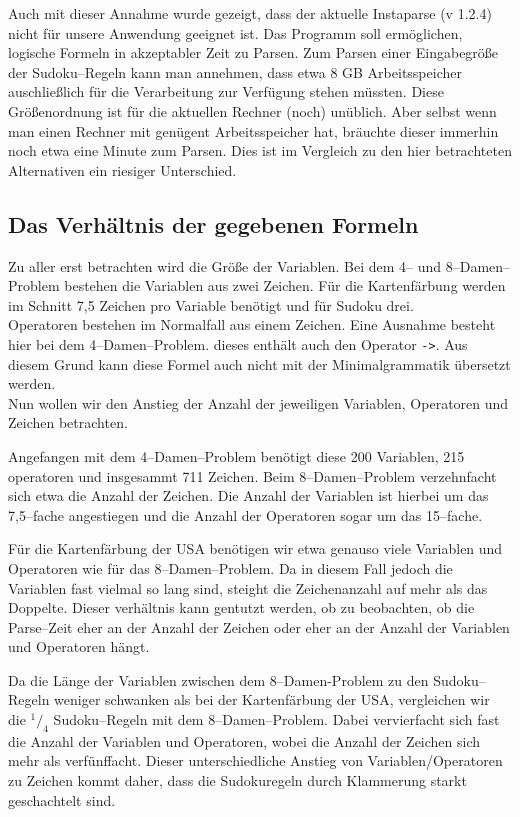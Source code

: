 \documentclass[ngerman,a4paper,abstracton,open=right,twoside=false,toc=listofnumbered,bibtotocnumbered]{scrreprt}
\begin{document}
Auch mit dieser Annahme wurde gezeigt, dass der aktuelle Instaparse (v 1.2.4) nicht für unsere Anwendung geeignet ist. Das Programm soll ermöglichen, logische Formeln in akzeptabler Zeit zu Parsen. Zum Parsen einer Eingabegröße der Sudoku--Regeln kann man annehmen, dass etwa 8 GB Arbeitsspeicher auschließlich für die Verarbeitung zur Verfügung stehen müssten. Diese Größenordnung ist für die aktuellen Rechner (noch) unüblich. Aber selbst wenn man einen Rechner mit genügent Arbeitsspeicher hat, bräuchte dieser immerhin noch etwa eine Minute zum Parsen. Dies ist im Vergleich zu den hier betrachteten Alternativen ein riesiger Unterschied.

\subsection{Das Verhältnis der gegebenen Formeln}

Zu aller erst betrachten wird die Größe der Variablen. Bei dem 4-- und 8--Damen--Problem bestehen die Variablen aus zwei Zeichen. Für die Kartenfärbung werden im Schnitt 7,5 Zeichen pro Variable benötigt und für Sudoku drei.\\

Operatoren bestehen im Normalfall aus einem Zeichen. Eine Ausnahme besteht hier bei dem 4--Damen--Problem. dieses enthält auch den Operator \lstinline|->|. Aus diesem Grund kann diese Formel auch nicht mit der Minimalgrammatik übersetzt werden.\\

Nun wollen wir den Anstieg der Anzahl der jeweiligen Variablen, Operatoren und Zeichen betrachten.

Angefangen mit dem 4--Damen--Problem benötigt diese 200 Variablen, 215 operatoren und insgesammt 711 Zeichen. Beim 8--Damen--Problem verzehnfacht sich etwa die Anzahl der Zeichen. Die Anzahl der Variablen ist hierbei um das 7,5--fache angestiegen und die Anzahl der Operatoren sogar um das 15--fache.

Für die Kartenfärbung der USA benötigen wir etwa genauso viele Variablen und Operatoren wie für das 8--Damen--Problem. Da in diesem Fall jedoch die Variablen fast vielmal so lang sind, steight die Zeichenanzahl auf mehr als das Doppelte. Dieser verhältnis kann gentutzt werden, ob zu beobachten, ob die Parse--Zeit eher an der Anzahl der Zeichen oder eher an der Anzahl der Variablen und Operatoren hängt.

Da die Länge der Variablen zwischen dem 8--Damen-Problem zu den Sudoku--Regeln weniger schwanken als bei der Kartenfärbung der USA, vergleichen wir die $^1/_4$ Sudoku--Regeln mit dem 8--Damen--Problem. Dabei vervierfacht sich fast die Anzahl der Variablen und Operatoren, wobei die Anzahl der Zeichen sich mehr als verfünffacht. Dieser unterschiedliche Anstieg von Variablen/Operatoren zu Zeichen kommt daher, dass die Sudokuregeln durch Klammerung starkt geschachtelt sind.
\end{document}
